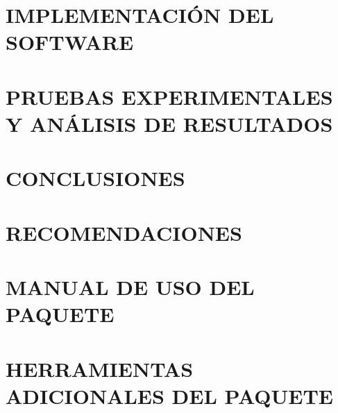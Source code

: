 \documentclass[letterpaper,titlepage,12pt,oneside,spanish,final]{report_eie}
\numberwithin{equation}{chapter}%
\numberwithin{figure}{chapter}%
\numberwithin{table}{chapter}%
\numberwithin{definition}{chapter}%
\numberwithin{lemma}{chapter}%
\numberwithin{theorem}{chapter}%
\numberwithin{corollary}{chapter}%
\numberwithin{condition}{chapter}%
\numberwithin{criterion}{chapter}%
\numberwithin{problem}{chapter}%
\numberwithin{property}{chapter}%
\numberwithin{proposition}{chapter}%
\numberwithin{solution}{chapter}%
\numberwithin{conjecture}{chapter}%
\begin{document}
\chapter{IMPLEMENTACIÓN DEL SOFTWARE}\label{CAP:software}
  

\chapter{PRUEBAS EXPERIMENTALES Y ANÁLISIS DE RESULTADOS}\label{CAP:resultados}


\chapter{CONCLUSIONES}\label{CAP:conclu}


\chapter{RECOMENDACIONES}\label{CAP:recomendaciones}


\appendix
\chapter{MANUAL DE USO DEL PAQUETE}\label{CAP:anexo0}
%

\chapter{HERRAMIENTAS ADICIONALES DEL PAQUETE}\label{CAP:anexo1}
%

\end{document}
